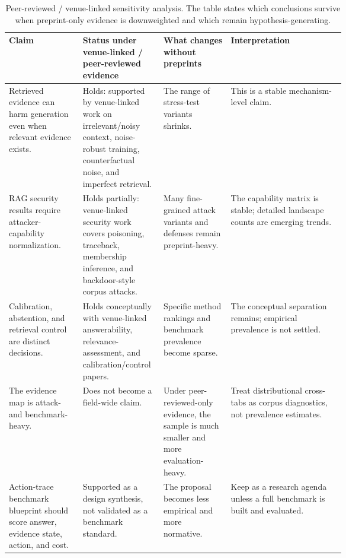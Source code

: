 \documentclass[11pt]{article}
\begin{document}

\begin{table}[t]
\centering
\scriptsize
\renewcommand{\arraystretch}{0.94}
\begin{tabularx}{\linewidth}{>{\raggedright\arraybackslash}p{0.22\linewidth}>{\raggedright\arraybackslash}p{0.24\linewidth}>{\raggedright\arraybackslash}p{0.20\linewidth}X}
\toprule
\textbf{Claim} & \textbf{Status under venue-linked / peer-reviewed evidence} & \textbf{What changes without preprints} & \textbf{Interpretation} \\
\midrule
Retrieved evidence can harm generation even when relevant evidence exists. & Holds: supported by venue-linked work on irrelevant/noisy context, noise-robust training, counterfactual noise, and imperfect retrieval. & The range of stress-test variants shrinks. & This is a stable mechanism-level claim. \\
RAG security results require attacker-capability normalization. & Holds partially: venue-linked security work covers poisoning, traceback, membership inference, and backdoor-style corpus attacks. & Many fine-grained attack variants and defenses remain preprint-heavy. & The capability matrix is stable; detailed landscape counts are emerging trends. \\
Calibration, abstention, and retrieval control are distinct decisions. & Holds conceptually with venue-linked answerability, relevance-assessment, and calibration/control papers. & Specific method rankings and benchmark prevalence become sparse. & The conceptual separation remains; empirical prevalence is not settled. \\
The evidence map is attack- and benchmark-heavy. & Does not become a field-wide claim. & Under peer-reviewed-only evidence, the sample is much smaller and more evaluation-heavy. & Treat distributional cross-tabs as corpus diagnostics, not prevalence estimates. \\
Action-trace benchmark blueprint should score answer, evidence state, action, and cost. & Supported as a design synthesis, not validated as a benchmark standard. & The proposal becomes less empirical and more normative. & Keep as a research agenda unless a full benchmark is built and evaluated. \\
\bottomrule
\end{tabularx}
\caption{Peer-reviewed / venue-linked sensitivity analysis. The table states which conclusions survive when preprint-only evidence is downweighted and which remain hypothesis-generating.}
\label{tab:peer-reviewed-sensitivity}
\end{table}
\end{document}
